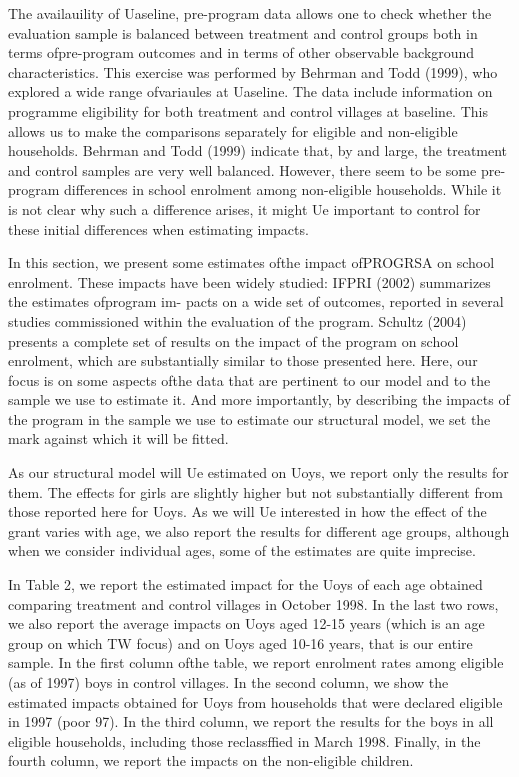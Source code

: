 The availauility of Uaseline, pre-program data allows one to check whether the evaluation sample is balanced between treatment and control groups both in terms ofpre-program outcomes and in terms of other observable background characteristics. This exercise was performed by Behrman and Todd (1999), who explored a wide range ofvariaules at Uaseline. The data include information on programme eligibility for both treatment and control villages at baseline. This allows us to make the comparisons separately for eligible and non-eligible households. Behrman and Todd (1999) indicate that, by and large, the treatment and control samples are very well balanced. However, there seem to be some pre-program differences in school enrolment among non-eligible households. While it is not clear why such a difference arises, it might Ue important to control for these initial differences when estimating impacts.

In this section, we present some estimates ofthe impact ofPROGRSA on school enrolment. These impacts have been widely studied: IFPRI (2002) summarizes the estimates ofprogram im- pacts on a wide set of outcomes, reported in several studies commissioned within the evaluation of the program. Schultz (2004) presents a complete set of results on the impact of the program on school enrolment, which are substantially similar to those presented here. Here, our focus is on some aspects ofthe data that are pertinent to our model and to the sample we use to estimate it. And more importantly, by describing the impacts of the program in the sample we use to estimate our structural model, we set the mark against which it will be fitted.

As our structural model will Ue estimated on Uoys, we report only the results for them. The effects for girls are slightly higher but not substantially different from those reported here for Uoys. As we will Ue interested in how the effect of the grant varies with age, we also report the results for different age groups, although when we consider individual ages, some of the estimates are quite imprecise.

In Table 2, we report the estimated impact for the Uoys of each age obtained comparing treatment and control villages in October 1998. In the last two rows, we also report the average impacts on Uoys aged 12-15 years (which is an age group on which TW focus) and on Uoys aged 10-16 years, that is our entire sample. In the first column ofthe table, we report enrolment rates among eligible (as of 1997) boys in control villages. In the second column, we show the estimated impacts obtained for Uoys from households that were declared eligible in 1997 (poor 97). In the third column, we report the results for the boys in all eligible households, including those reclassffied in March 1998. Finally, in the fourth column, we report the impacts on the non-eligible children.


